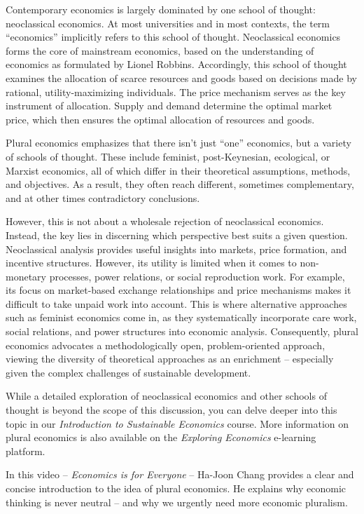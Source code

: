 \documentclass[
  a4paper,
  openany]{book}
\begin{document}
\begin{tcolorbox}[enhanced jigsaw, left=2mm, arc=.35mm, titlerule=0mm, opacityback=0, leftrule=.75mm, title={Plural economics}, breakable, bottomtitle=1mm, rightrule=.15mm, coltitle=black, toptitle=1mm, bottomrule=.15mm, colback=white, opacitybacktitle=0.6, colbacktitle=quarto-callout-note-color!10!white, toprule=.15mm, colframe=quarto-callout-note-color-frame]

Contemporary economics is largely dominated by one school of thought:
neoclassical economics. At most universities and in most contexts, the
term ``economics'' implicitly refers to this school of thought.
Neoclassical economics forms the core of mainstream economics, based on
the understanding of economics as formulated by Lionel Robbins.
Accordingly, this school of thought examines the allocation of scarce
resources and goods based on decisions made by rational,
utility-maximizing individuals. The price mechanism serves as the key
instrument of allocation. Supply and demand determine the optimal market
price, which then ensures the optimal allocation of resources and goods.

Plural economics emphasizes that there isn't just ``one'' economics, but
a variety of schools of thought. These include feminist, post-Keynesian,
ecological, or Marxist economics, all of which differ in their
theoretical assumptions, methods, and objectives. As a result, they
often reach different, sometimes complementary, and at other times
contradictory conclusions.

However, this is not about a wholesale rejection of neoclassical
economics. Instead, the key lies in discerning which perspective best
suits a given question. Neoclassical analysis provides useful insights
into markets, price formation, and incentive structures. However, its
utility is limited when it comes to non-monetary processes, power
relations, or social reproduction work. For example, its focus on
market-based exchange relationships and price mechanisms makes it
difficult to take unpaid work into account. This is where alternative
approaches such as feminist economics come in, as they systematically
incorporate care work, social relations, and power structures into
economic analysis. Consequently, plural economics advocates a
methodologically open, problem-oriented approach, viewing the diversity
of theoretical approaches as an enrichment -- especially given the
complex challenges of sustainable development.

While a detailed exploration of neoclassical economics and other schools
of thought is beyond the scope of this discussion, you can delve deeper
into this topic in our \emph{Introduction to Sustainable Economics}
course. More information on plural economics is also available on the
\emph{Exploring Economics} e-learning platform.

In this video -- \emph{Economics is for Everyone} -- Ha-Joon Chang
provides a clear and concise introduction to the idea of plural
economics. He explains why economic thinking is never neutral -- and why
we urgently need more economic pluralism.

\end{tcolorbox}
\end{document}

